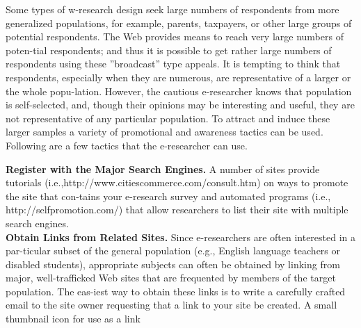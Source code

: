 \documentclass[a4,9pt]{beamer}
\begin{document}
\begin{frame}
\hspace*{0.5cm} Some types of w-research design seek large numbers of respondents from more generalized populations, for example, parents, taxpayers, or other large groups of potential respondents. The Web provides means to reach very large numbers of poten-tial respondents; and thus it is possible to get rather large numbers of respondents using these ''broadcast'' type appeals. It is tempting to think that respondents, especially when they are numerous, are representative of a larger or the whole popu-lation. However, the cautious e-researcher knows that population is self-selected, and, though their opinions may be interesting and useful, they are not representative of any particular population. To attract and induce these larger samples a variety of promotional and awareness tactics can be used. Following are a few tactics that the e-researcher can use.\\

\vspace*{0.5cm}
\end{frame}

\begin{frame}
\textbf{Register with the Major Search Engines.}  \hspace*{0.2cm} A number of sites provide tutorials (i.e.,http://www.citiescommerce.com/consult.htm) on ways to promote the site that con-tains your e-research survey and automated programs (i.e., http://selfpromotion.com/) that allow researchers to list their site with multiple search engines.\\

 \vspace*{0.4cm}
\textbf{Obtain Links from Related Sites.} \hspace*{0.2cm} Since e-researchers are often interested in a par-ticular subset of the general population (e.g., English language teachers or disabled students), appropriate subjects can often be obtained by linking from major, well-trafficked Web sites that are frequented by members of the target population. The eas-iest way to obtain these links is to write a carefully crafted email to the site owner requesting that a link to your site be created. A small thumbnail icon for use as a link\\
\end{frame}
\end{document}
